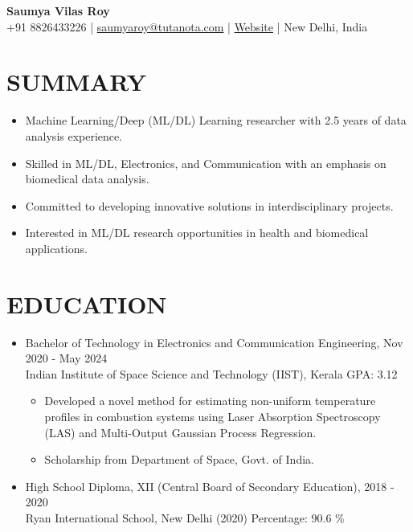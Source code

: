 \documentclass[11pt]{article}
\begin{document}
	
	\begin{center}
		{\huge\bf Saumya Vilas Roy} \\
		
		\vspace{3mm} %
		{\large
			+91 8826433226 |
			\href{mailto:saumyaroy@tutanota.com}{saumyaroy@tutanota.com} |
				\href{https://caffineaddic.github.io/}{Website} |
			New Delhi, India
		} \\
		{
	
		}
	\end{center}
	
	\section*{\bf SUMMARY}
	\begin{itemize}[leftmargin=*,noitemsep,topsep=0pt]
		\item Machine Learning/Deep (ML/DL) Learning researcher with 2.5 years of data analysis experience.
		\item Skilled in ML/DL, Electronics, and Communication with an emphasis on biomedical data analysis.
		\item Committed to developing innovative solutions in interdisciplinary projects.
		\item Interested in ML/DL research opportunities in health and biomedical applications.
	\end{itemize}
	
	\section*{\bf EDUCATION}
	\begin{itemize}[leftmargin=*,noitemsep,topsep=0pt]
		\item Bachelor of Technology in Electronics and Communication Engineering, \hfill Nov 2020 - May 2024 \\
		Indian Institute of Space Science and Technology (IIST), Kerala \hfill GPA: 3.12
		\begin{itemize}[leftmargin=*,noitemsep,topsep=0pt]
			\item Developed a novel method for estimating non-uniform temperature profiles in combustion systems using Laser Absorption Spectroscopy (LAS) and Multi-Output Gaussian Process Regression.
			\item Scholarship from Department of Space, Govt. of India.
		\end{itemize}
		\item High School Diploma, XII (Central Board of Secondary Education), \hfill 2018 - 2020\\
		Ryan International School, New Delhi (2020)  \hfill Percentage: 90.6 \%
	\end{itemize}
	
\end{document}
